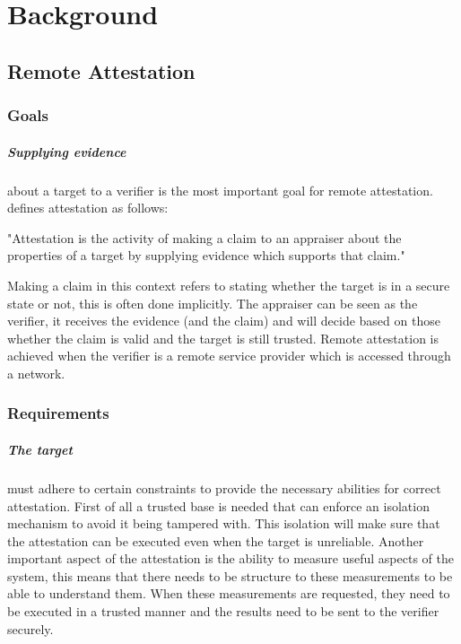 \documentclass{report}
\begin{document}
\chapter{Background}

\section{Remote Attestation}

\subsection*{Goals}

\paragraph*{Supplying evidence} 
about a target to a verifier is the most important goal for remote attestation. \cite{CokerGeorge2011Pora} defines attestation as follows: \begin{displayquote} "Attestation is the activity of making a claim to an appraiser about the properties of a target by supplying evidence which supports that claim." \end{displayquote} Making a claim in this context refers to stating whether the target is in a secure state or not, this is often done implicitly. The appraiser can be seen as the verifier, it receives the evidence (and the claim) and will decide based on those whether the claim is valid and the target is still trusted. Remote attestation is achieved when the verifier is a remote service provider which is accessed through a network.

\subsection*{Requirements}

\paragraph*{The target}
must adhere to certain constraints to provide the necessary abilities for correct attestation. First of all a trusted base is needed that can enforce an isolation mechanism to avoid it being tampered with. This isolation will make sure that the attestation can be executed even when the target is unreliable. Another important aspect of the attestation is the ability to measure useful aspects of the system, this means that there needs to be structure to these measurements to be able to understand them. When these measurements are requested, they need to be executed in a trusted manner and the results need to be sent to the verifier securely.
\end{document}
